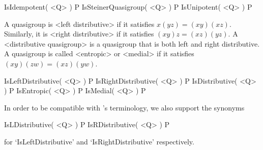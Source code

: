 \>IsIdempotent( <Q> ) P
\>IsSteinerQuasigroup( <Q> ) P
\>IsUnipotent( <Q> ) P

A quasigroup is <left distributive> if it
satisfies $x(yz)=(xy)(xz)$. Similarly, it is <right
distributive> if it satisfies
$(xy)z=(xz)(yz)$. A <distributive quasigroup> is a quasigroup that is both left
and right distributive. A quasigroup is called <entropic> or <medial> if it satisfies $(xy)(zw)=(xz)(yw)$.

\>IsLeftDistributive( <Q> ) P
\>IsRightDistributive( <Q> ) P
\>IsDistributive( <Q> ) P
\>IsEntropic( <Q> ) P
\>IsMedial( <Q> ) P

In order to be compatible with {\GAP}'s terminology, we also support the synonyms

\>IsLDistributive( <Q> ) P
\>IsRDistributive( <Q> ) P

for `IsLeftDistributive' and `IsRightDistributive' respectively.


